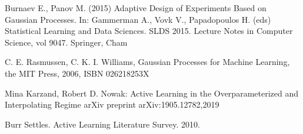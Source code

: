 \documentclass[a4paper]{article}
\begin{document}
\begin{thebibliography}{}

Burnaev E., Panov M. (2015) 
Adaptive Design of Experiments Based on Gaussian Processes. In: Gammerman A., Vovk V., Papadopoulos H. (eds) Statistical Learning and Data Sciences. SLDS 2015. 
Lecture Notes in Computer Science, vol 9047. Springer, Cham

C. E. Rasmussen, C. K. I. Williams, 
Gaussian Processes for Machine Learning, 
the MIT Press, 2006, ISBN 026218253X

Mina Karzand, Robert D. Nowak:
Active Learning in the Overparameterized
and Interpolating Regime
arXiv preprint arXiv:1905.12782,2019

Burr Settles. 
Active Learning Literature Survey.  
2010.

\end{thebibliography}
\end{document}
